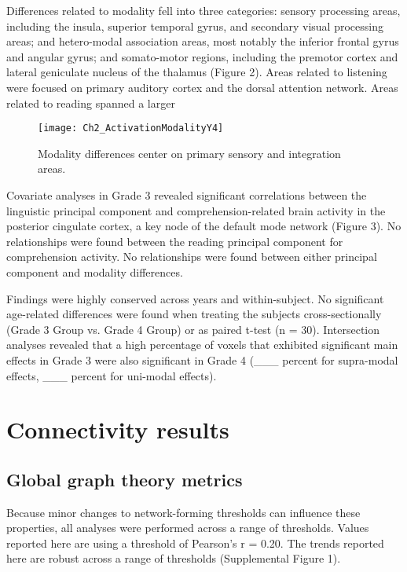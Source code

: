 Differences related to modality fell into three categories: sensory processing areas, including the insula, superior temporal gyrus, and secondary visual processing areas; and hetero-modal association areas, most notably the inferior frontal gyrus and angular gyrus; and somato-motor regions, including the premotor cortex and lateral geniculate nucleus of the thalamus (Figure 2). Areas related to listening were focused on primary auditory cortex and the dorsal attention network. Areas related to reading spanned a larger 

\begin{figure}[!b]
\centering
\texttt{[image: Ch2\_ActivationModalityY4]}
    \caption[Modality differences center on primary sensory and integration areas.]{Modality differences center on primary sensory and integration areas.}
\label{fig:ch2_modality}
\end{figure}

Covariate analyses in Grade 3 revealed significant correlations between the linguistic principal component and comprehension-related brain activity in the posterior cingulate cortex, a key node of the default mode network (Figure 3). No relationships were found between the reading principal component for comprehension activity. No relationships were found between either principal component and modality differences.

Findings were highly conserved across years and within-subject. No significant age-related differences were found when treating the subjects cross-sectionally (Grade 3 Group vs. Grade 4 Group) or as paired t-test (n = 30). Intersection analyses revealed that a high percentage of voxels that exhibited significant main effects in Grade 3 were also significant in Grade 4 (___ percent for supra-modal effects, ___ percent for uni-modal effects).

\section{Connectivity results}


\subsection{Global graph theory metrics}
Because minor changes to network-forming thresholds can influence these properties, all analyses were performed across a range of thresholds. Values reported here are using a threshold of Pearson’s r = 0.20. The trends reported here are robust across a range of thresholds (Supplemental Figure 1). 

